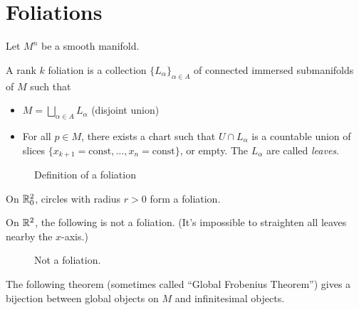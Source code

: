 \section{Foliations}
Let $M^{n}$ be a smooth manifold.
\begin{definition}[Foliation]
A rank $k$ foliation is a collection $\{L_\alpha\} _{\alpha \in A}$ of connected immersed submanifolds of $M$ such that
\begin{itemize}
    \item $M = \bigsqcup_{\alpha \in  A} L_\alpha$  (disjoint union)
    \item For all $p \in M$, there exists a chart such that $U \cap L_\alpha$ is a countable union of slices $\{x_{k+1} = \text{const}, \ldots, x_n = \text{const}\}$, or empty.
        The $L_\alpha$ are called \emph{leaves}.
\end{itemize}
\end{definition}

\begin{figure}[H]
    \centering
    \caption{Definition of a foliation}
    \label{fig:definition-of-foliation}
\end{figure}


\begin{eg}
    On $\mathbb{R}^2_0$, circles with radius $r > 0$ form a foliation.
\end{eg}
\begin{eg}
    On $\mathbb{R}^2$, the following is not a foliation. (It's impossible to straighten all leaves nearby the $x$-axis.)

\begin{figure}[H]
    \centering
    \caption{Not a foliation.}
    \label{fig:not-a-foliation-example}
\end{figure}
\end{eg}

\filbreak
The following theorem (sometimes called ``Global Frobenius Theorem'') gives a bijection between global objects on $M$ and infinitesimal objects.

